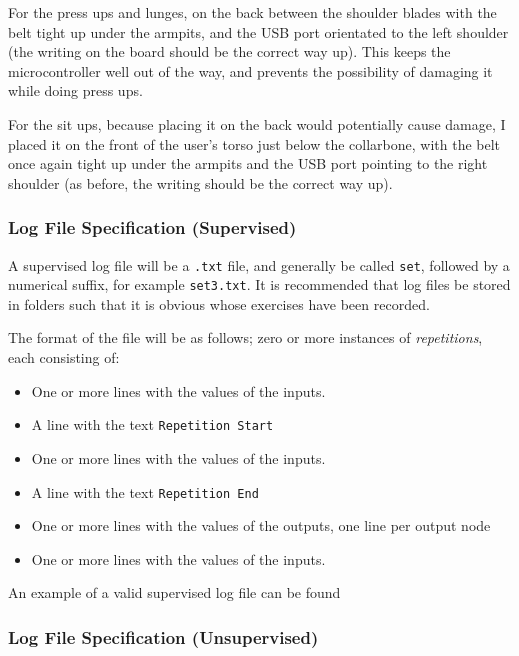 \documentclass[a4paper]{article}
\begin{document}
For the press ups and lunges, on the back between the shoulder blades with the belt tight up under the armpits, and the USB port orientated to the left shoulder (the writing on the board should be the correct way up). This keeps the microcontroller well out of the way, and prevents the possibility of damaging it while doing press ups.


For the sit ups, because placing it on the back would potentially cause damage, I placed it on the front of the user's torso just below the collarbone, with the belt once again tight up under the armpits and the USB port pointing to the right shoulder (as before, the writing should be the correct way up).


\subsubsection{Log File Specification (Supervised)}

A supervised log file will be a \lstinline{.txt} file, and generally be called \lstinline{set}, followed by a numerical suffix, for example \lstinline{set3.txt}. It is recommended that log files be stored in folders such that it is obvious whose exercises have been recorded.

The format of the file will be as follows; zero or more instances of \emph{repetitions}, each consisting of:

\begin{itemize}
\item One or more lines with the values of the inputs.
\item A line with the text \lstinline{Repetition Start}
\item One or more lines with the values of the inputs.
\item A line with the text \lstinline{Repetition End}
\item One or more lines with the values of the outputs, one line per output node
\item One or more lines with the values of the inputs.
\end{itemize}

An example of a valid supervised log file can be found 

\subsubsection{Log File Specification (Unsupervised)}
\end{document}
